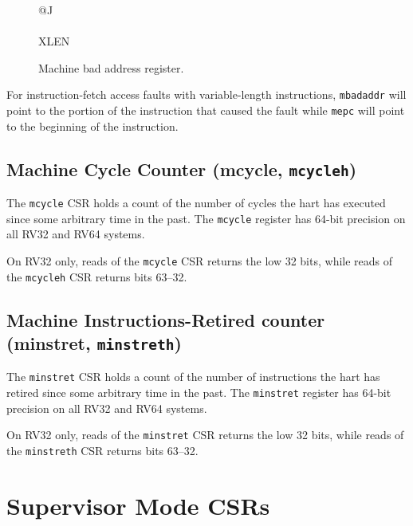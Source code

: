 \begin{figure}[h!]
	{\footnotesize
		\begin{center}
			\begin{tabular}{@{}J}
				 \\
				\hline
				 \\
				\hline
				XLEN \\
			\end{tabular}
		\end{center}
	}
	\vspace{-0.1in}
	\caption{Machine bad address register.}
	\label{fig:mbadaddrreg}
\end{figure}

For instruction-fetch access faults with variable-length instructions,
{\tt mbadaddr} will point to the portion of the instruction that caused the
fault while {\tt mepc} will point to the beginning of the instruction.

\subsection{Machine Cycle Counter (mcycle,
{\tt mcycleh})}\label{machine-cycle-counter-mcycle-mcycleh}

The {\tt mcycle} CSR holds a count of the number of cycles the hart has
executed since some arbitrary time in the past. The {\tt mcycle} register has
64-bit precision on all RV32 and RV64 systems.

On RV32 only, reads of the {\tt mcycle} CSR returns the low 32 bits, while
reads of the {\tt mcycleh} CSR returns bits 63--32.

\subsection{Machine Instructions-Retired counter (minstret,
{\tt minstreth})}\label{machine-instructions-retired-counter-minstret-minstreth}

The {\tt minstret} CSR holds a count of the number of instructions the hart
has retired since some arbitrary time in the past. The {\tt minstret} register
has 64-bit precision on all RV32 and RV64 systems.

On RV32 only, reads of the {\tt minstret} CSR returns the low 32 bits, while
reads of the {\tt minstreth} CSR returns bits 63--32.

\section{Supervisor Mode CSRs}\label{supervisor-mode-csrs}

